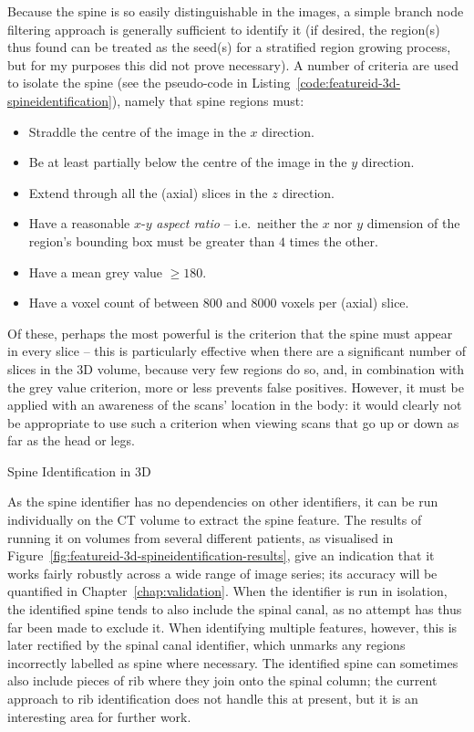Because the spine is so easily distinguishable in the images, a simple branch node filtering approach is generally sufficient to identify it (if desired, the region(s) thus found can be treated as the seed(s) for a stratified region growing process, but for my purposes this did not prove necessary). A number of criteria are used to isolate the spine (see the pseudo-code in Listing~\ref{code:featureid-3d-spineidentification}), namely that spine regions must:
%
\begin{itemize}

\item Straddle the centre of the image in the $x$ direction.
\item Be at least partially below the centre of the image in the $y$ direction.
\item Extend through all the (axial) slices in the $z$ direction.
\item Have a reasonable $x$-$y$ \emph{aspect ratio} -- i.e.~neither the $x$ nor $y$ dimension of the region's bounding box must be greater than $4$ times the other.
\item Have a mean grey value $\ge 180$.
\item Have a voxel count of between $800$ and $8000$ voxels per (axial) slice.

\end{itemize}
%
Of these, perhaps the most powerful is the criterion that the spine must appear in every slice -- this is particularly effective when there are a significant number of slices in the 3D volume, because very few regions do so, and, in combination with the grey value criterion, more or less prevents false positives. However, it must be applied with an awareness of the scans' location in the body: it would clearly not be appropriate to use such a criterion when viewing scans that go up or down as far as the head or legs.

\begin{stulisting}[t]
\caption{Spine Identification in 3D}
\label{code:featureid-3d-spineidentification}

\end{stulisting}

As the spine identifier has no dependencies on other identifiers, it can be run individually on the CT volume to extract the spine feature. The results of running it on volumes from several different patients, as visualised in Figure~\ref{fig:featureid-3d-spineidentification-results}, give an indication that it works fairly robustly across a wide range of image series; its accuracy will be quantified in Chapter~\ref{chap:validation}. When the identifier is run in isolation, the identified spine tends to also include the spinal canal, as no attempt has thus far been made to exclude it. When identifying multiple features, however, this is later rectified by the spinal canal identifier, which unmarks any regions incorrectly labelled as spine where necessary. The identified spine can sometimes also include pieces of rib where they join onto the spinal column; the current approach to rib identification does not handle this at present, but it is an interesting area for further work.

